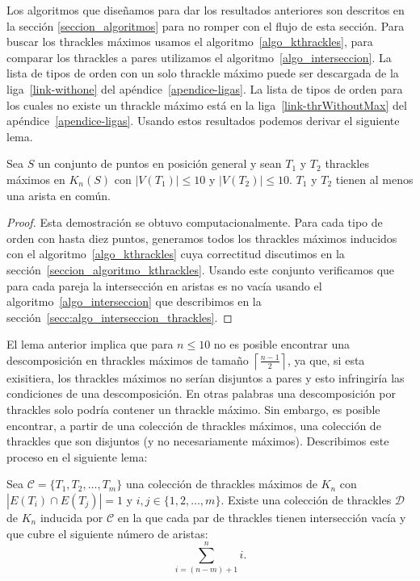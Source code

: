   Los algoritmos que diseñamos para dar los resultados anteriores son descritos
  en la sección \ref{seccion_algoritmos} para no romper con el flujo de esta
  sección. Para buscar los thrackles máximos usamos el
  algoritmo~\ref{algo_kthrackles}, para comparar los thrackles a pares utilizamos
  el algoritmo~\ref{algo_interseccion}. La lista de tipos de orden
  con un solo thrackle máximo puede ser descargada de la liga~\ref{link-withone} del apéndice~\ref{apendice-ligas}. La lista de tipos de orden para los cuales no existe un thrackle máximo
  está en la liga~\ref{link-thrWithoutMax} del apéndice~\ref{apendice-ligas}.
  Usando estos resultados podemos derivar el siguiente lema.
  \begin{lemma}\label{lema:thdisjuntos}
    Sea $S$ un conjunto de puntos en posición general y sean $T_1$ y $T_2$ thrackles máximos en $K_n(S)$
    con $|V(T_1)|\leq 10$ y $|V(T_2)|\leq 10$. $T_1$ y $T_2$ tienen al menos una arista en común.
  \end{lemma}
  \begin{proof}
    Esta demostración se obtuvo computacionalmente. Para cada tipo de orden con hasta diez puntos,
    generamos todos los thrackles  máximos inducidos con el algoritmo~\ref{algo_kthrackles} cuya
    correctitud discutimos en la sección~\ref{seccion_algoritmo_kthrackles}. Usando este conjunto
    verificamos que para cada pareja la intersección en aristas es no vacía usando el
    algoritmo~\ref{algo_interseccion} que describimos en la
    sección~\ref{secc:algo_interseccion_thrackles}.
  \end{proof}
  El lema anterior implica que para $n\leq 10$ no es posible encontrar una
  descomposición en thrackles máximos de tamaño
  $\left\lceil\frac{n-1}{2}\right\rceil$, ya que, si esta exisitiera, los
  thrackles máximos no serían disjuntos a pares y esto infringiría las
  condiciones de una descomposición.
  En otras palabras una descomposición por thrackles solo podría contener un
  thrackle máximo. Sin embargo, es posible encontrar, a partir de una colección
  de thrackles máximos, una colección de thrackles que son disjuntos (y no necesariamente máximos).
  Describimos este proceso en el siguiente lema:
  \begin{lemma}\label{lema:existedescomp}
    Sea $\mathcal{C}=\{T_1,T_2,\dots,T_m\}$ una colección de thrackles máximos
    de $K_n$ con $|E(T_i)\cap E(T_j)| = 1$ y $ i,j \in \{1,2,\dots,m\}$.
    Existe una colección  de thrackles $\mathcal{D}$ de $K_n$ inducida por
    $\mathcal{C}$ en la que cada par de thrackles tienen intersección vacía y que
    cubre el siguiente número de aristas:
    \[\displaystyle \sum^n_{i=(n-m) + 1}i.\]
  \end{lemma}
